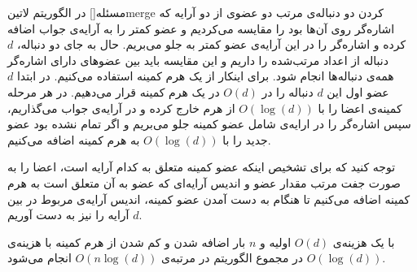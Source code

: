 
‌مسئله[]
در الگوریتم  
‌لاتین{merge}
کردن دو دنباله‌ی مرتب دو عضوی از دو آرایه که اشاره‌گر روی آن‌ها بود را مقایسه می‌کردیم و عضو کمتر را به آرایه‌ی جواب اضافه کرده و اشاره‌گر را در این آرایه‌ی عضو کمتر به جلو می‌بریم.
حال به جای دو دنباله،
$d$
دنباله از اعداد مرتب‌شده را داریم و این مقایسه باید بین عضوهای دارای اشاره‌گر همه‌ی دنباله‌ها انجام شود. برای اینکار از یک هرم کمینه استفاده می‌کنیم. در ابتدا $d$ عضو اول این $d$ دنباله را در $O(d)$ در یک هرم کمینه قرار می‌دهیم.
در هر مرحله کمینه‌ی اعضا را با
$O(\log(d))$
از هرم خارج کرده و در آرایه‌ی جواب می‌گذاریم، سپس اشاره‌گر را در ارایه‌ی شامل عضو کمینه جلو می‌بریم و اگر تمام نشده بود عضو جدید را با
$O(\log(d))$
به هرم کمینه اضافه می‌کنیم.

توجه کنید که برای تشخیص اینکه عضو کمینه متعلق به کدام آرایه است، اعضا را به صورت جفت مرتب مقدار عضو و اندیس آرایه‌ای که عضو به آن متعلق است به هرم کمینه اضافه می‌کنیم تا هنگام به دست آمدن عضو کمینه، اندیس آرایه‌ی مربوط در بین $d$ آرایه را نیز به دست آوریم.

با یک هزینه‌ی $O(d)$ اولیه و $n$ بار اضافه شدن و کم شدن از هرم کمینه با هزینه‌ی
$O(\log(d))$
در مجموع الگوریتم در مرتبه‌ی
$O(n\log(d))$
انجام می‌شود.










